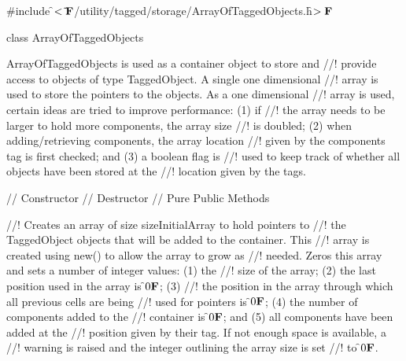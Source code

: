 
\indent \#include \f$<\tilde{ }{\bf F}$/utility/tagged/storage/ArrayOfTaggedObjects.h\f$>{\bf F}$

\indent class ArrayOfTaggedObjects

\indent{}

\indent ArrayOfTaggedObjects is used as a container object to store and
//! provide access to objects of type TaggedObject. A single one dimensional
//! array is used to store the pointers to the objects. As a one dimensional
//! array is used, certain ideas are tried to improve performance: (1) if
//! the array needs to be larger to hold more components, the array size
//! is doubled; (2) when adding/retrieving components, the array location
//! given by the components tag is first checked; and (3) a boolean flag is
//! used to keep track of whether all objects have been stored at the
//! location given by the tags.

\indent // Constructor
\indent // Destructor
\indent // Pure Public Methods

//! Creates an array of size \p sizeInitialArray to hold pointers to
//! the TaggedObject objects that will be added to the container. This
//! array is created using new() to allow the array to grow as
//! needed. Zeros this array and sets a number of integer values: (1) the
//! size of the array; (2) the last position used in the array is \f$0{\bf F}$; (3)
//! the position in the array through which all previous cells are being
//! used for pointers is \f$0{\bf F}$; (4) the number of components added to the
//! container is \f$0{\bf F}$; and (5) all components have been added at the
//! position given by their tag. If not enough space is available, a
//! warning is raised and the integer outlining the array size is set
//! to \f$0{\bf F}$. 

